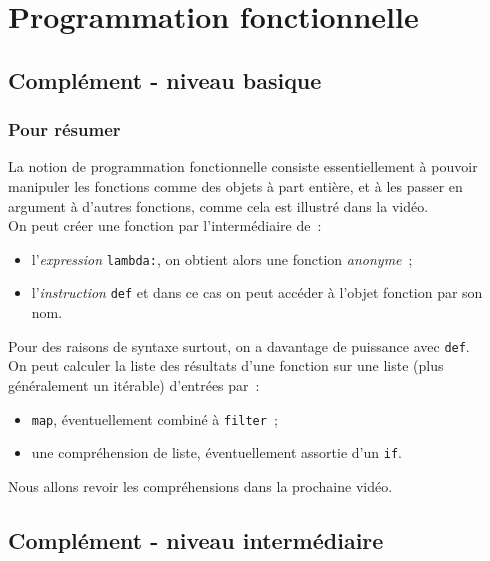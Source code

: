     \hypertarget{programmation-fonctionnelle}{%
\section{Programmation
fonctionnelle}\label{programmation-fonctionnelle}}

    \hypertarget{compluxe9ment---niveau-basique}{%
\subsection{Complément - niveau
basique}\label{compluxe9ment---niveau-basique}}

    \hypertarget{pour-ruxe9sumer}{%
\subsubsection{Pour résumer}\label{pour-ruxe9sumer}}

    La notion de programmation fonctionnelle consiste essentiellement à
pouvoir manipuler les fonctions comme des objets à part entière, et à
les passer en argument à d'autres fonctions, comme cela est illustré
dans la vidéo.\\

    On peut créer une fonction par l'intermédiaire de~:

\begin{itemize}
	\item 
	l'\emph{expression} \texttt{lambda:}, on obtient alors une fonction
	\emph{anonyme}~;
	\item
	l'\emph{instruction} \texttt{def} et dans ce cas on
	peut accéder à l'objet fonction par son nom.
\end{itemize}

Pour des raisons de syntaxe surtout, on a davantage de puissance avec
\texttt{def}.\\

    On peut calculer la liste des résultats d'une fonction sur une liste
(plus généralement un itérable) d'entrées par~:

\begin{itemize}
	\item 
	\texttt{map}, éventuellement combiné à \texttt{filter}~;
	\item
	une compréhension de liste,
	éventuellement assortie d'un \texttt{if}.
\end{itemize}

Nous allons revoir les compréhensions dans la prochaine vidéo.

    \hypertarget{compluxe9ment---niveau-intermuxe9diaire}{%
\subsection{Complément - niveau
intermédiaire}\label{compluxe9ment---niveau-intermuxe9diaire}}


